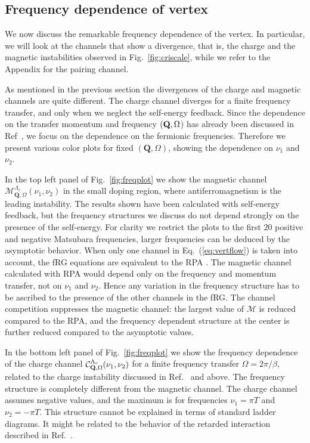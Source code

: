 \subsection{Frequency dependence of vertex}

We now discuss the remarkable frequency dependence of the vertex. 
In particular, we will look at the channels that show a divergence, that is, the charge and the magnetic instabilities observed in Fig.~\ref{fig:criscale}, while we refer to the Appendix for the pairing channel.

As mentioned in the previous section the divergences of the charge and magnetic channels are quite different. The charge channel diverges for a finite frequency transfer, and only when we neglect the self-energy feedback. 
Since the dependence on the transfer momentum and frequency $(\mathbf{Q},\Omega$) has already been discussed in Ref~, we focus on the dependence on the fermionic frequencies. Therefore we present various color plots for fixed  $(\mathbf{Q},\Omega)$, showing the dependence on $\nu_1$ and $\nu_2$. 
 
In the top left panel of Fig.~\ref{fig:freqplot} we show the magnetic channel $\mathcal{M}^{\Lambda_c}_{\mathbf{Q},\Omega}(\nu_1,\nu_2)$ in the small doping region, where antiferromagnetism is the leading instability. 
The results shown have been calculated with self-energy feedback, but the frequency structures we discuss do not depend strongly on the presence of the self-energy. 
For clarity we restrict the plots to the first $20$ positive and negative Matsubara frequencies, larger frequencies can be deduced by the asymptotic behavior.\cite{Wentzell2016a}
When only one channel in Eq.~(\ref{eq:vertflow}) is taken into account, the fRG equations are equivalent to the RPA . 
The magnetic channel calculated with RPA would depend only on the frequency and momentum transfer, not on $\nu_1$ and $\nu_2$.
Hence any variation in the frequency structure has to be ascribed to the presence of the other channels in the fRG.
The channel competition suppresses the magnetic channel: the largest value of $\mathcal{M}$ is reduced compared to the RPA, and the frequency dependent structure at the center is further reduced compared to the asymptotic values. 

In the bottom left panel of Fig.~\ref{fig:freqplot} we show the frequency dependence of the charge channel $\mathcal{C}^{\Lambda_c}_{\mathbf{Q},\Omega}(\nu_1,\nu_2)$ for a finite frequency transfer $\Omega=2\pi/\beta$, related to the charge instability discussed in Ref.~ and above. 
The frequency structure is completely different from the magnetic channel. 
The charge channel assumes negative values, and the maximum is for frequencies $\nu_1 = \pi T$ and $\nu_2=-\pi T$. 
This structure cannot be explained in terms of standard ladder diagrams. It might be related to the behavior of the retarded interaction described in Ref.~.

